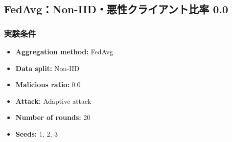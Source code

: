 \documentclass[a4j,twocolumn,dvipdfmx]{jsarticle}
\begin{document}
\subsection{FedAvg：Non-IID・悪性クライアント比率 0.0}

\subsubsection{実験条件}

\begin{itemize}
    \item \textbf{Aggregation method:} FedAvg
    \item \textbf{Data split:} Non-IID
    \item \textbf{Malicious ratio:} 0.0
    \item \textbf{Attack:} Adaptive attack
    \item \textbf{Number of rounds:} 20
    \item \textbf{Seeds:} 1, 2, 3
\end{itemize}

\end{document}
